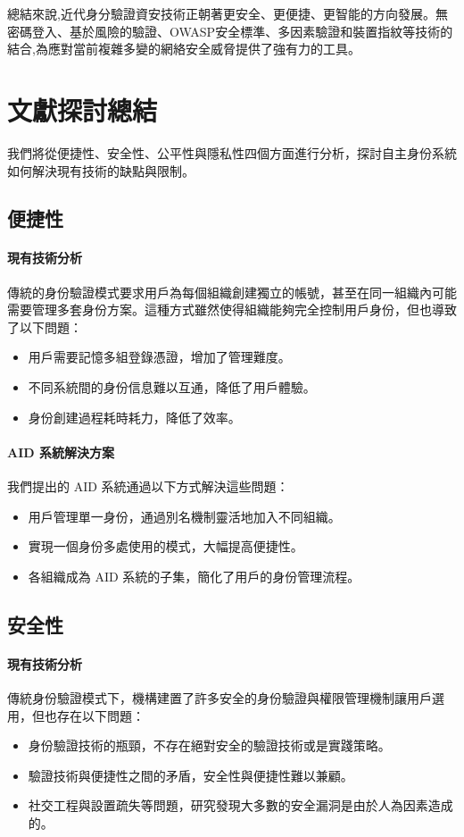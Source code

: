 總結來說,近代身分驗證資安技術正朝著更安全、更便捷、更智能的方向發展。無密碼登入、基於風險的驗證、OWASP安全標準、多因素驗證和裝置指紋等技術的結合,為應對當前複雜多變的網絡安全威脅提供了強有力的工具。


\section{文獻探討總結}

我們將從便捷性、安全性、公平性與隱私性四個方面進行分析，探討自主身份系統如何解決現有技術的缺點與限制。

\subsection{便捷性}

\paragraph{現有技術分析}
傳統的身份驗證模式要求用戶為每個組織創建獨立的帳號，甚至在同一組織內可能需要管理多套身份方案。這種方式雖然使得組織能夠完全控制用戶身份，但也導致了以下問題：

\begin{itemize}
  \item 用戶需要記憶多組登錄憑證，增加了管理難度。
  \item 不同系統間的身份信息難以互通，降低了用戶體驗。
  \item 身份創建過程耗時耗力，降低了效率。
\end{itemize}


\paragraph{AID 系統解決方案}
我們提出的 AID 系統通過以下方式解決這些問題：


\begin{itemize}
  \item 用戶管理單一身份，通過別名機制靈活地加入不同組織。
  \item 實現一個身份多處使用的模式，大幅提高便捷性。
  \item 各組織成為 AID 系統的子集，簡化了用戶的身份管理流程。
\end{itemize}

\subsection{安全性}

\paragraph{現有技術分析}
傳統身份驗證模式下，機構建置了許多安全的身份驗證與權限管理機制讓用戶選用，但也存在以下問題：
\begin{itemize}
  \item 身份驗證技術的瓶頸，不存在絕對安全的驗證技術或是實踐策略。
  \item 驗證技術與便捷性之間的矛盾，安全性與便捷性難以兼顧。
  \item 社交工程與設置疏失等問題，研究發現大多數的安全漏洞是由於人為因素造成的。
\end{itemize}

